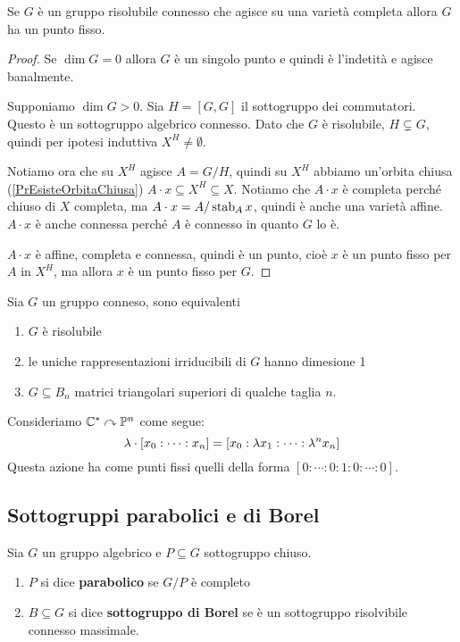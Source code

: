 \begin{theorem}\label{ThPuntoFissoBorel}
Se $G$ \`e un gruppo risolubile connesso che agisce su una variet\`a completa allora $G$ ha un punto fisso.
\end{theorem}
\begin{proof}
Se $\dim G=0$ allora $G$ \`e un singolo punto e quindi \`e l'indetit\`a e agisce banalmente.


Supponiamo $\dim G>0$. Sia $H=[G,G]$ il sottogruppo dei commutatori. Questo \`e un sottogruppo algebrico connesso. Dato che $G$ \`e risolubile, $H\subsetneq G$, quindi per ipotesi induttiva $X^H\neq \emptyset$.

Notiamo ora che su $X^H$ agisce $A=G/H$, quindi su $X^H$ abbiamo un'orbita chiusa (\ref{PrEsisteOrbitaChiusa}) $A\cdot x\subseteq X^H\subseteq X$. Notiamo che $A\cdot x$ \`e completa perch\'e chiuso di $X$ completa, ma $A\cdot x=A/\operatorname{stab}_A x$, quindi \`e anche una variet\`a affine. $A\cdot x$ \`e anche connessa perch\'e $A$ \`e connesso in quanto $G$ lo \`e.

$A\cdot x$ \`e affine, completa e connessa, quindi \`e un punto, cio\`e $x$ \`e un punto fisso per $A$ in $X^H$, ma allora $x$ \`e un punto fisso per $G$.
\end{proof}
\begin{corollary}\label{CorCaratterizzazioneConnessiRisolubili}
Sia $G$ un gruppo conneso, sono equivalenti
\begin{enumerate}
	\item $G$ \`e risolubile
	\item le uniche rappresentazioni irriducibili di $G$ hanno dimesione 1
	\item $G\subseteq B_n$ matrici triangolari superiori di qualche taglia $n$.
\end{enumerate}
\end{corollary}


\begin{example}
Consideriamo $\mathbb{C}^\ast\curvearrowright \mathbb{P}^n$ come segue:
\[\lambda\cdot [x_0:\cdots:x_n]=[x_0:\lambda x_1:\cdots:\lambda^n x_n]\]
Questa azione ha come punti fissi quelli della forma $[0:\cdots:0:1:0:\cdots:0]$.
\end{example}

\subsection{Sottogruppi parabolici e di Borel}
\begin{definition}
Sia $G$ un gruppo algebrico e $P\subseteq G$ sottogruppo chiuso.
\begin{enumerate}
	\item $P$ si dice \textbf{parabolico} se $G/P$ \`e completo
	\item $B\subseteq G$ si dice \textbf{sottogruppo di Borel} se \`e un sottogruppo risolvibile connesso massimale.
\end{enumerate}
\end{definition}

